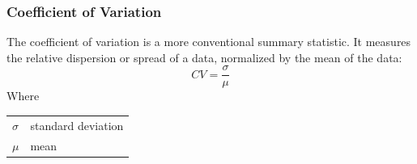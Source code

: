 \documentclass[final,3p,times,onecolumn,sort&compress]{elsarticle}
\makeatletter
\newenvironment{conditions}
  {\par\vspace{\abovedisplayskip}\noindent\begin{tabular}{>{$}l<{$} @{${}={}$} l}}
  {\end{tabular}\par\vspace{\belowdisplayskip}}
\makeatother
\begin{document}
\subsubsection{Coefficient of Variation}
The coefficient of variation is a more conventional summary statistic.
It measures the relative dispersion or spread of a data, normalized by the mean of the data: 
\begin{equation}
    CV = \frac{\sigma}{\mu}
\end{equation}
Where
\begin{conditions}
     \sigma & standard deviation\\
     \mu & mean \\   
\end{conditions}
\end{document}
